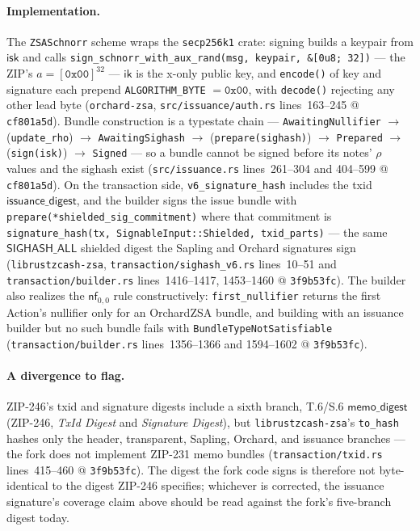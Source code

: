 \documentclass[11pt,a4paper]{article}
\theoremstyle{definition}
\newcommand{\nfsym}{\mathsf{nf}}
\begin{document}
\paragraph{Implementation.} The \texttt{ZSASchnorr} scheme wraps the
\texttt{secp256k1} crate: signing builds a keypair from $\mathsf{isk}$
and calls \texttt{sign\_schnorr\_with\_aux\_rand(msg, keypair,
\&[0u8;~32])} --- the ZIP's $a = [\mathtt{0x00}]^{32}$ ---
$\mathsf{ik}$ is the x-only public key, and \texttt{encode()} of key and
signature each prepend \texttt{ALGORITHM\_BYTE} $= \mathtt{0x00}$, with
\texttt{decode()} rejecting any other lead byte (\texttt{orchard-zsa},
\texttt{src/issuance/auth.rs} lines~163--245 @ \texttt{cf801a5d}).
Bundle construction is a typestate chain --- \texttt{AwaitingNullifier}
$\rightarrow$ (\texttt{update\_rho}) $\rightarrow$
\texttt{AwaitingSighash} $\rightarrow$ (\texttt{prepare(sighash)})
$\rightarrow$ \texttt{Prepared} $\rightarrow$ (\texttt{sign(isk)})
$\rightarrow$ \texttt{Signed} --- so a bundle cannot be signed before its
notes' $\rho$ values and the sighash exist (\texttt{src/issuance.rs}
lines~261--304 and 404--599 @ \texttt{cf801a5d}). On the transaction
side, \texttt{v6\_signature\_hash} includes the txid
$\mathsf{issuance\_digest}$, and the builder signs the issue bundle with
\texttt{prepare(*shielded\_sig\_commitment)} where that commitment is
\texttt{signature\_hash(tx, SignableInput::Shielded, txid\_parts)} ---
the same $\mathsf{SIGHASH\_ALL}$ shielded digest the Sapling and Orchard
signatures sign (\texttt{librustzcash-zsa},
\texttt{transaction/sighash\_v6.rs} lines~10--51 and
\texttt{transaction/builder.rs} lines~1416--1417, 1453--1460 @
\texttt{3f9b53fc}). The builder also realizes the $\nfsym_{0,0}$ rule
constructively: \texttt{first\_nullifier} returns the first Action's
nullifier only for an OrchardZSA bundle, and building with an issuance
builder but no such bundle fails with
\texttt{BundleTypeNotSatisfiable}
(\texttt{transaction/builder.rs} lines~1356--1366 and 1594--1602 @
\texttt{3f9b53fc}).

\paragraph{A divergence to flag.} ZIP-246's txid and signature digests
include a sixth branch, T.6/S.6 $\mathsf{memo\_digest}$ (ZIP-246,
\emph{TxId Digest} and \emph{Signature Digest}), but
\texttt{librustzcash-zsa}'s \texttt{to\_hash} hashes only the header,
transparent, Sapling, Orchard, and issuance branches --- the fork does
not implement ZIP-231 memo bundles (\texttt{transaction/txid.rs}
lines~415--460 @ \texttt{3f9b53fc}). The digest the fork code signs
is therefore not
byte-identical to the digest ZIP-246 specifies; whichever is corrected,
the issuance signature's coverage claim above should be read against the
fork's five-branch digest today.
\end{document}
